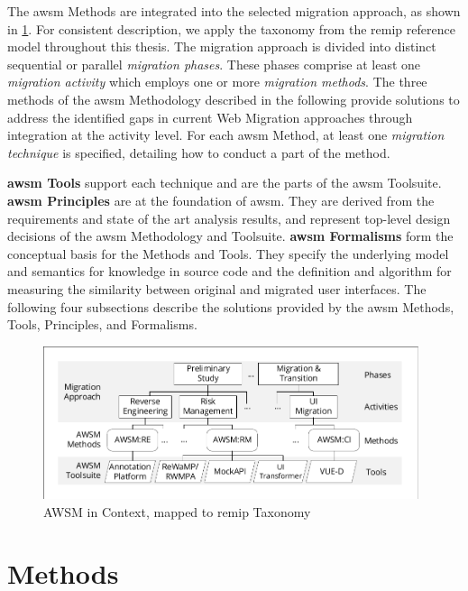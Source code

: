 The \gls{awsm} Methods are integrated into the selected migration approach, as shown in \cref{fig:methods-techniques-tools}.
For consistent description, we apply the taxonomy from the \gls{remip} reference model \autocite{Sneed2010SoftwareMigration} throughout this thesis.
The migration approach is divided into distinct sequential or parallel \emph{migration phases}.
These phases comprise at least one \emph{migration activity} which employs one or more \emph{migration methods}.
The three methods of the \gls{awsm} Methodology described in the following provide solutions to address the identified gaps in current \gls{Web Migration} approaches through integration at the activity level.
For each \gls{awsm} Method, at least one \emph{migration technique} is specified, detailing how to conduct a part of the method.

\textbf{\gls{awsm} Tools} support each technique and are the parts of the \gls{awsm} Toolsuite.
\textbf{\gls{awsm} Principles} are at the foundation of \gls{awsm}.
They are derived from the requirements and state of the art analysis results, and represent top-level design decisions of the \gls{awsm} Methodology and Toolsuite.
\textbf{\gls{awsm} Formalisms} form the conceptual basis for the Methods and Tools.
They specify the underlying model and semantics for knowledge in  source code and the definition and algorithm for measuring the similarity between original and migrated user interfaces.
The following four subsections describe the solutions provided by the \gls{awsm} Methods, Tools, Principles, and Formalisms.

\begin{figure}[h!]
\hypertarget{fig:methods-techniques-tools}{%
\centering
\includegraphics[width=0.98\textwidth]{../figures/methods-context.pdf}
\caption[AWSM in Context]{AWSM in Context, mapped to \gls{remip} Taxonomy}\label{fig:methods-techniques-tools}
}
\end{figure}

\vspace{-12pt}
\hypertarget{sec:solution.methods}{%
\section{Methods}\label{sec:solution.methods}}
\vspace{11pt}

